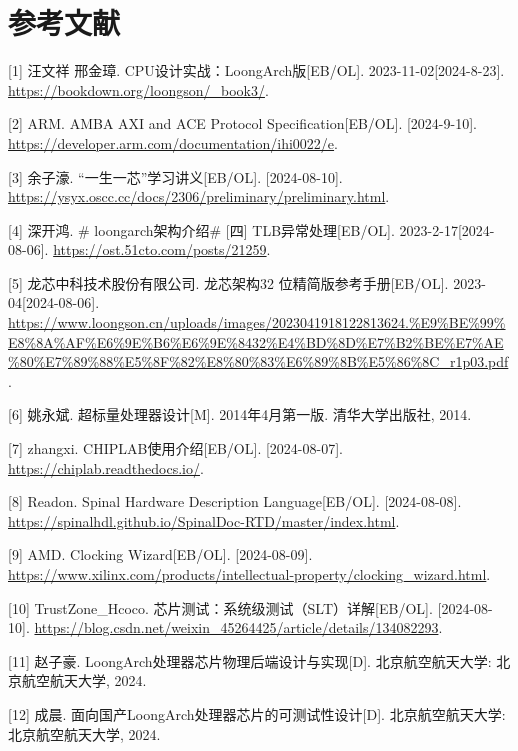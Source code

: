 
\chapter*{参考文献}\label{chap:30-references}


{[}1{]} 汪文祥 邢金璋. CPU设计实战：LoongArch版{[}EB/OL{]}. 2023-11-02{[}2024-8-23{]}. \url{https://bookdown.org/loongson/_book3/}.

{[}2{]} ARM. AMBA AXI and ACE Protocol Specification{[}EB/OL{]}. {[}2024-9-10{]}. \url{https://developer.arm.com/documentation/ihi0022/e}.

{[}3{]} 余子濠. ``一生一芯''学习讲义{[}EB/OL{]}. {[}2024-08-10{]}. \url{https://ysyx.oscc.cc/docs/2306/preliminary/preliminary.html}.

{[}4{]} 深开鸿. \# loongarch架构介绍\# {[}四{]} TLB异常处理{[}EB/OL{]}. 2023-2-17{[}2024-08-06{]}. \url{https://ost.51cto.com/posts/21259}.

{[}5{]} 龙芯中科技术股份有限公司. 龙芯架构32 位精简版参考手册{[}EB/OL{]}. 2023-04{[}2024-08-06{]}. \url{https://www.loongson.cn/uploads/images/2023041918122813624.\%E9\%BE\%99\%E8\%8A\%AF\%E6\%9E\%B6\%E6\%9E\%8432\%E4\%BD\%8D\%E7\%B2\%BE\%E7\%AE\%80\%E7\%89\%88\%E5\%8F\%82\%E8\%80\%83\%E6\%89\%8B\%E5\%86\%8C_r1p03.pdf}.

{[}6{]} 姚永斌. 超标量处理器设计{[}M{]}. 2014年4月第一版. 清华大学出版社, 2014.

{[}7{]} zhangxi. CHIPLAB使用介绍{[}EB/OL{]}. {[}2024-08-07{]}. \url{https://chiplab.readthedocs.io/}.

{[}8{]} Readon. Spinal Hardware Description Language{[}EB/OL{]}. {[}2024-08-08{]}. \url{https://spinalhdl.github.io/SpinalDoc-RTD/master/index.html}.

{[}9{]} AMD. Clocking Wizard{[}EB/OL{]}. {[}2024-08-09{]}. \url{https://www.xilinx.com/products/intellectual-property/clocking_wizard.html}.

{[}10{]} TrustZone\_Hcoco. 芯片测试：系统级测试（SLT）详解{[}EB/OL{]}. {[}2024-08-10{]}. \url{https://blog.csdn.net/weixin_45264425/article/details/134082293}.

{[}11{]} 赵子豪. LoongArch处理器芯片物理后端设计与实现{[}D{]}. 北京航空航天大学: 北京航空航天大学, 2024.

{[}12{]} 成晨. 面向国产LoongArch处理器芯片的可测试性设计{[}D{]}. 北京航空航天大学: 北京航空航天大学, 2024.

